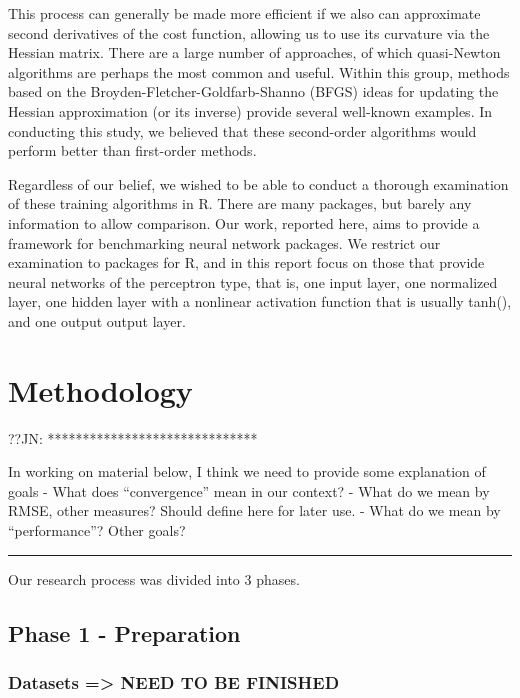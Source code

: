 This process can generally be made more efficient if we also can
approximate second derivatives of the cost function, allowing us to use
its curvature via the Hessian matrix. There are a large number of
approaches, of which quasi-Newton algorithms are perhaps the most common
and useful. Within this group, methods based on the
Broyden-Fletcher-Goldfarb-Shanno (BFGS) ideas for updating the Hessian
approximation (or its inverse) provide several well-known examples. In
conducting this study, we believed that these second-order algorithms
would perform better than first-order methods.

Regardless of our belief, we wished to be able to conduct a thorough
examination of these training algorithms in R. There are many packages,
but barely any information to allow comparison. Our work, reported here,
aims to provide a framework for benchmarking neural network packages. We
restrict our examination to packages for R, and in this report focus on
those that provide neural networks of the perceptron type, that is, one
input layer, one normalized layer, one hidden layer with a nonlinear
activation function that is usually tanh(), and one output output layer.

\hypertarget{methodology}{%
\section{Methodology}\label{methodology}}

??JN: ******************************

In working on material below, I think we need to provide some
explanation of goals - What does ``convergence'' mean in our context? -
What do we mean by RMSE, other measures? Should define here for later
use. - What do we mean by ``performance''? Other goals?

\begin{center}\rule{0.5\linewidth}{0.5pt}\end{center}

Our research process was divided into 3 phases.

\hypertarget{phase-1---preparation}{%
\subsection{Phase 1 - Preparation}\label{phase-1---preparation}}

\hypertarget{datasets-need-to-be-finished}{%
\subsubsection{Datasets =\textgreater{} NEED TO BE
FINISHED}\label{datasets-need-to-be-finished}}

